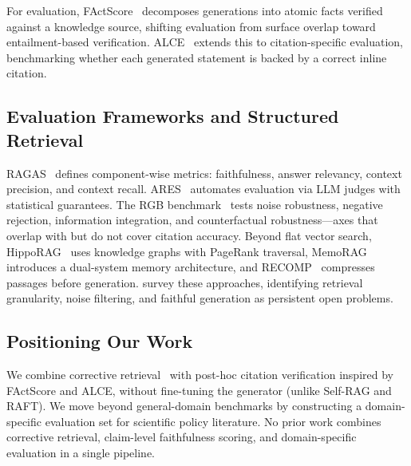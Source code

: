 \documentclass[11pt]{article}
\begin{document}
For evaluation, FActScore~\cite{min-etal-2023-factscore} decomposes generations into atomic facts verified against a knowledge source, shifting evaluation from surface overlap toward entailment-based verification. ALCE~\cite{gao2023enabling} extends this to citation-specific evaluation, benchmarking whether each generated statement is backed by a correct inline citation.

\subsection{Evaluation Frameworks and Structured Retrieval}

RAGAS~\cite{es2024ragas} defines component-wise metrics: faithfulness, answer relevancy, context precision, and context recall. ARES~\cite{saadfalcon2024ares} automates evaluation via LLM judges with statistical guarantees. The RGB benchmark~\cite{chen2024benchmarking} tests noise robustness, negative rejection, information integration, and counterfactual robustness---axes that overlap with but do not cover citation accuracy. Beyond flat vector search, HippoRAG~\cite{gutierrez2024hipporag} uses knowledge graphs with PageRank traversal, MemoRAG~\cite{qian2024memorag} introduces a dual-system memory architecture, and RECOMP~\cite{xu2024recomp} compresses passages before generation. \citet{gao2024retrievalaugmented} survey these approaches, identifying retrieval granularity, noise filtering, and faithful generation as persistent open problems.

\subsection{Positioning Our Work}

We combine corrective retrieval~\cite{yan2024corrective} with post-hoc citation verification inspired by FActScore and ALCE, without fine-tuning the generator (unlike Self-RAG and RAFT). We move beyond general-domain benchmarks by constructing a domain-specific evaluation set for scientific policy literature. No prior work combines corrective retrieval, claim-level faithfulness scoring, and domain-specific evaluation in a single pipeline.


\newpage


\end{document}
